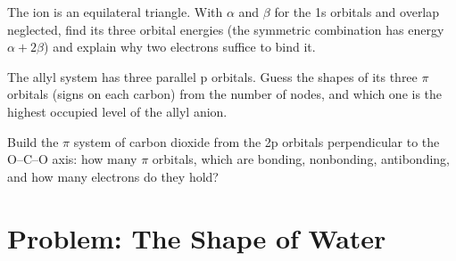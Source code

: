 \begin{exercise}[$\star\star\star$]\label{exo:b2:fragment-orbitals:10}
The  ion is an equilateral triangle. With $\alpha$ and $\beta$ for the 1s
orbitals and overlap neglected, find its three orbital energies (the symmetric
combination has energy $\alpha + 2\beta$) and explain why two electrons suffice to
bind it.
\end{exercise}

\begin{exercise}[$\star\star\star$]\label{exo:b2:fragment-orbitals:11}
The allyl system  has three parallel p orbitals. Guess the shapes of
its three $\pi$ orbitals (signs on each carbon) from the number of nodes, and which
one is the highest occupied level of the allyl anion.
\end{exercise}

\begin{exercise}[$\star\star\star$]\label{exo:b2:fragment-orbitals:12}
Build the $\pi$ system of carbon dioxide from the 2p orbitals perpendicular to the
O--C--O axis: how many $\pi$ orbitals, which are bonding, nonbonding,
antibonding, and how many electrons do they hold?
\end{exercise}

\section{Problem: The Shape of Water}

